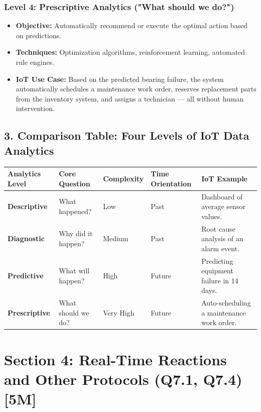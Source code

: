 \subsubsection{Level 4: Prescriptive Analytics ("What should we do?")}
\begin{itemize}
  \item   \textbf{Objective:} Automatically recommend or execute the optimal action based on predictions.
  \item   \textbf{Techniques:} Optimization algorithms, reinforcement learning, automated rule engines.
  \item   \textbf{IoT Use Case:} Based on the predicted bearing failure, the system automatically schedules a maintenance work order, reserves replacement parts from the inventory system, and assigns a technician — all without human intervention.
\end{itemize}


\subsection{3. Comparison Table: Four Levels of IoT Data Analytics}

\begin{table}[H]
\centering
\begin{tabular}{|p{}|p{}|p{}|p{}|p{}|}
\hline
Analytics Level & Core Question & Complexity & Time Orientation & IoT Example \\
\hline
\textbf{Descriptive} & What happened? & Low & Past & Dashboard of average sensor values. \\
\hline
\textbf{Diagnostic} & Why did it happen? & Medium & Past & Root cause analysis of an alarm event. \\
\hline
\textbf{Predictive} & What will happen? & High & Future & Predicting equipment failure in 14 days. \\
\hline
\textbf{Prescriptive} & What should we do? & Very High & Future & Auto-scheduling a maintenance work order. \\
\hline
\end{tabular}
\end{table}


\section{Section 4: Real-Time Reactions and Other Protocols (Q7.1, Q7.4) [5M]}

